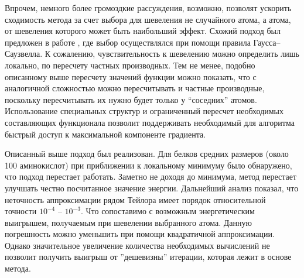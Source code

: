   Впрочем, немного более громоздкие рассуждения, возможно, позволят ускорить 
  сходимость метода за счет выбора для шевеления не случайного атома, а атома, 
  от шевеления которого может быть наибольший эффект. Схожий подход был предложен в работе \cite{nutini2015coordinate}, где выбор осуществлялся при помощи правила 
  Гаусса--Саузвелла. К сожалению, чувствительность к шевелению можно определить лишь 
  локально, по пересчету частных производных. Тем не менее, подобно 
  описанному выше пересчету значений функции можно показать, что с аналогичной 
  сложностью можно пересчитывать и частные производные, поскольку пересчитывать их 
  нужно будет только у ``соседних'' атомов. Использование специальных структур и ограниченный пересчет необходимых составляющих функционала позволит поддерживать необходимый для алгоритма быстрый доступ к максимальной компоненте градиента.

  Описанный выше подход был реализован. Для белков средних размеров (около 100 аминокислот) при приближении к локальному минимуму было обнаружено, что подход перестает работать. Заметно не доходя до минимума, метод перестает улучшать честно посчитанное значение энергии. Дальнейший анализ показал, что неточность аппроксимации рядом Тейлора имеет порядок относительной точности $10^{-4}$ -- $10^{-3}$. Что сопоставимо с возможным энергетическим выигрышем, получаемым при шевелении выбранного атома. Данную погрешность можно уменьшить при помощи квадратичной аппроксимации. Однако значительное увеличение количества необходимых вычислений не позволит получить выигрыш от ''дешевизны'' итерации, которая лежит в основе метода. 

